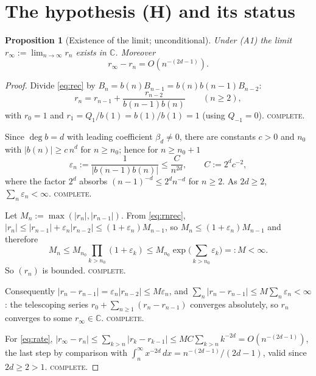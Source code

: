 \documentclass[11pt]{article}
\newtheorem{proposition}[theorem]{Proposition}
\theoremstyle{definition}
\newcommand{\bd}{\beta_d}
\newcommand{\rinf}{r_\infty}
\newcommand{\C}{\mathbb{C}}
\begin{document}
\section{The hypothesis (H) and its status}

\begin{proposition}[Existence of the limit; unconditional]\label{prop:exists}
Under \textup{(A1)} the limit $\rinf:=\lim_{n\to\infty}r_n$ exists in $\C$.
Moreover
\begin{equation}\label{eq:rate}
\rinf-r_n=O\!\left(n^{-(2d-1)}\right).
\end{equation}
\end{proposition}

\begin{proof}
Divide \eqref{eq:rec} by $B_n=b(n)B_{n-1}=b(n)b(n-1)B_{n-2}$:
\begin{equation}\label{eq:rnrec}
r_n=r_{n-1}+\frac{r_{n-2}}{b(n-1)b(n)}\qquad(n\ge2),
\end{equation}
with $r_0=1$ and $r_1=Q_1/b(1)=b(1)/b(1)=1$ (using $Q_{-1}=0$).
\textsc{complete.}

Since $\deg b=d$ with leading coefficient $\bd\neq0$, there are constants
$c>0$ and $n_0$ with $|b(n)|\ge c\,n^{d}$ for $n\ge n_0$; hence for $n\ge n_0+1$
\begin{equation}\label{eq:eps}
\varepsilon_n:=\frac{1}{|b(n-1)b(n)|}\le \frac{C}{n^{2d}},\qquad C:=2^{d}c^{-2},
\end{equation}
where the factor $2^d$ absorbs $(n-1)^{-d}\le 2^d n^{-d}$ for $n\ge2$.
As $2d\ge2$, $\sum_n\varepsilon_n<\infty$. \textsc{complete.}

Let $M_n:=\max(|r_n|,|r_{n-1}|)$. From \eqref{eq:rnrec},
$|r_n|\le|r_{n-1}|+\varepsilon_n|r_{n-2}|\le(1+\varepsilon_n)M_{n-1}$, so
$M_n\le(1+\varepsilon_n)M_{n-1}$ and therefore
\[
M_n\le M_{n_0}\prod_{k>n_0}(1+\varepsilon_k)\le
M_{n_0}\exp\Big(\sum_{k>n_0}\varepsilon_k\Big)=:M<\infty .
\]
So $(r_n)$ is bounded. \textsc{complete.}

Consequently $|r_n-r_{n-1}|=\varepsilon_n|r_{n-2}|\le M\varepsilon_n$, and
$\sum_n|r_n-r_{n-1}|\le M\sum_n\varepsilon_n<\infty$: the telescoping series
$r_0+\sum_{n\ge1}(r_n-r_{n-1})$ converges absolutely, so $r_n$ converges to some
$\rinf\in\C$. \textsc{complete.}

For \eqref{eq:rate}, $|\rinf-r_n|\le\sum_{k>n}|r_k-r_{k-1}|
\le MC\sum_{k>n}k^{-2d}=O(n^{-(2d-1)})$, the last step by comparison with
$\int_n^\infty x^{-2d}\,dx=n^{-(2d-1)}/(2d-1)$, valid since $2d\ge2>1$.
\textsc{complete.}
\end{proof}
\end{document}
